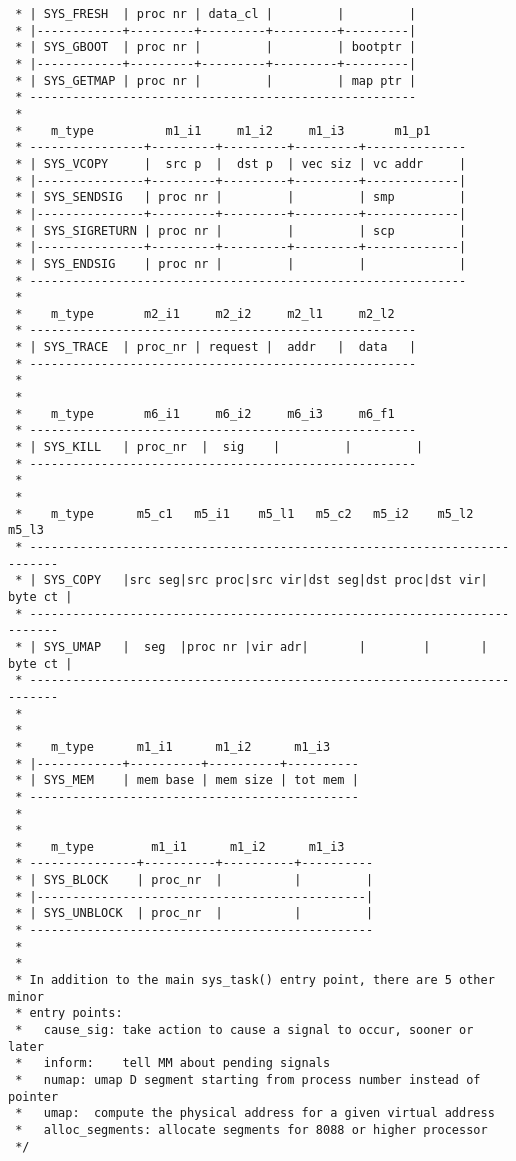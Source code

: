\begin{verbatim}
 * | SYS_FRESH  | proc nr | data_cl |         |         |
 * |------------+---------+---------+---------+---------|
 * | SYS_GBOOT  | proc nr |         |         | bootptr |
 * |------------+---------+---------+---------+---------|
 * | SYS_GETMAP | proc nr |         |         | map ptr |
 * ------------------------------------------------------
 *
 *    m_type          m1_i1     m1_i2     m1_i3       m1_p1
 * ----------------+---------+---------+---------+--------------
 * | SYS_VCOPY     |  src p  |  dst p  | vec siz | vc addr     |
 * |---------------+---------+---------+---------+-------------|
 * | SYS_SENDSIG   | proc nr |         |         | smp         |
 * |---------------+---------+---------+---------+-------------|
 * | SYS_SIGRETURN | proc nr |         |         | scp         |
 * |---------------+---------+---------+---------+-------------|
 * | SYS_ENDSIG    | proc nr |         |         |             |
 * -------------------------------------------------------------
 *
 *    m_type       m2_i1     m2_i2     m2_l1     m2_l2
 * ------------------------------------------------------
 * | SYS_TRACE  | proc_nr | request |  addr   |  data   |
 * ------------------------------------------------------
 *
 *
 *    m_type       m6_i1     m6_i2     m6_i3     m6_f1
 * ------------------------------------------------------
 * | SYS_KILL   | proc_nr  |  sig    |         |         |
 * ------------------------------------------------------
 *
 *
 *    m_type      m5_c1   m5_i1    m5_l1   m5_c2   m5_i2    m5_l2   m5_l3
 * --------------------------------------------------------------------------
 * | SYS_COPY   |src seg|src proc|src vir|dst seg|dst proc|dst vir| byte ct |
 * --------------------------------------------------------------------------
 * | SYS_UMAP   |  seg  |proc nr |vir adr|       |        |       | byte ct |
 * --------------------------------------------------------------------------
 *
 *
 *    m_type      m1_i1      m1_i2      m1_i3
 * |------------+----------+----------+----------
 * | SYS_MEM    | mem base | mem size | tot mem |
 * ----------------------------------------------
 *
 *
 *    m_type        m1_i1      m1_i2      m1_i3
 * ---------------+----------+----------+----------
 * | SYS_BLOCK    | proc_nr  |		    |		  |
 * |----------------------------------------------|
 * | SYS_UNBLOCK  | proc_nr  |		    |		  |
 * ------------------------------------------------
 *
 *
 * In addition to the main sys_task() entry point, there are 5 other minor
 * entry points:
 *   cause_sig:	take action to cause a signal to occur, sooner or later
 *   inform:	tell MM about pending signals
 *   numap:	umap D segment starting from process number instead of pointer
 *   umap:	compute the physical address for a given virtual address
 *   alloc_segments: allocate segments for 8088 or higher processor
 */


\end{verbatim}
